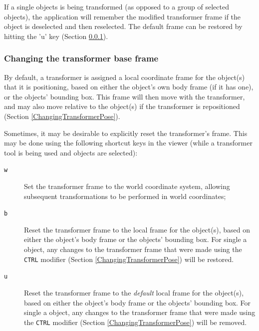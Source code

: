 \documentclass{article}
\begin{document}
If a single objects is being transformed (as opposed to a group of
selected objects), the application will remember the modified
transformer frame if the object is deselected and then reselected. The
default frame can be restored by hitting the 'u' key (Section
\ref{ChangingTransformerBaseFrame:sec}).

\subsubsection{Changing the transformer base frame}
\label{ChangingTransformerBaseFrame:sec}

By default, a transformer is assigned a local coordinate frame for the
object(s) that it is positioning, based on either the object's own
body frame (if it has one), or the objects' bounding box. This frame
will then move with the transformer, and may also move relative to the
object(s) if the transformer is repositioned (Section
\ref{ChangingTransformerPose}).

Sometimes, it may be desirable to explicitly reset the transformer's
frame. This may be done using the following shortcut keys in the
viewer (while a transformer tool is being used and objects are
selected):

\begin{description}

\item[{\tt w}]\mbox{}

Set the transformer frame to the world coordinate system, allowing
subsequent transformations to be performed in world coordinates;

\item[{\tt b}]\mbox{}

Reset the transformer frame to the local frame for the object(s),
based on either the object's body frame or the objects' bounding box.
For single a object, any changes to the transformer frame that were
made using the {\tt CTRL} modifier (Section
\ref{ChangingTransformerPose}) will be restored.

\item[{\tt u}]\mbox{}

Reset the transformer frame to the {\it default} local frame for the
object(s), based on either the object's body frame or the objects'
bounding box.  For single a object, any changes to the transformer
frame that were made using the {\tt CTRL} modifier (Section
\ref{ChangingTransformerPose}) will be removed.

\end{description}
\end{document}
